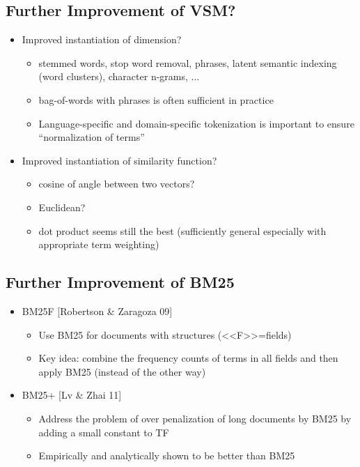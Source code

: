 \subsection{Further Improvement of VSM?}
\begin{itemize}
\item Improved instantiation of dimension?
\begin{itemize}
\item  stemmed words, stop word removal, phrases, latent semantic indexing (word clusters), character n-grams, ...
\item  bag-of-words with phrases is often sufficient in practice
\item  Language-specific and domain-specific tokenization is important to
ensure “normalization of terms”
\end{itemize}

\item  Improved instantiation of similarity function?
\begin{itemize}
\item  cosine of angle between two vectors?
\item  Euclidean?
\item  dot product seems still the best (sufficiently general especially with appropriate term weighting)
\end{itemize}
\end{itemize}


\subsection{Further Improvement of BM25}
\begin{itemize}
\item BM25F [Robertson \& Zaragoza 09]
\begin{itemize}
\item Use BM25 for documents with structures (<<F>>=fields)
\item Key idea: combine the frequency counts of terms in all fields and then apply BM25 (instead of the other way)
\end{itemize}

\item BM25+ [Lv \& Zhai 11]
\begin{itemize}
\item Address the problem of over penalization of long documents
by BM25 by adding a small constant to TF
\item Empirically and analytically shown to be better than BM25
\end{itemize}
\end{itemize}



